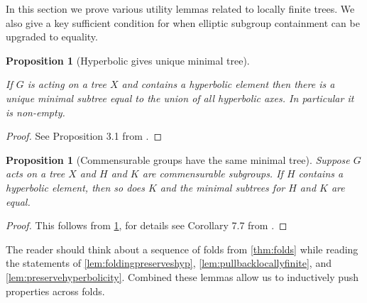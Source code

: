 \documentclass[12pt,parskip=full]{report}
\theoremstyle{plain}
\newtheorem{prop}[thm]{Proposition}
\theoremstyle{definition}
\begin{document}
In this section we prove various utility lemmas related to locally finite trees. We also give a key sufficient condition for when elliptic subgroup containment can be upgraded to equality.

\begin{prop}
    [Hyperbolic gives unique minimal tree]
    \label{pro:uniquemintree}
    
    If $G$ is acting on a tree $X$ and contains a hyperbolic element then there is a unique minimal subtree equal to the union of all hyperbolic axes. In particular it is non-empty.
\end{prop}
\begin{proof}
See Proposition 3.1 from \cite{hymanbass}.
\end{proof}
\begin{prop}
    [Commensurable groups have the same minimal tree]
    \label{pro:commintree}
    Suppose $G$ acts on a tree $X$ and $H$ and $K$ are commensurable subgroups. If $H$ contains a hyperbolic element, then so does $K$ and the minimal subtrees for $H$ and $K$ are equal.
\end{prop}
\begin{proof}
    This follows from \ref{pro:uniquemintree}, for details see Corollary 7.7 from \cite{hymanbass}.
\end{proof}

The reader should think about a sequence of folds from \ref{thm:folds} while reading the statements of \ref{lem:foldingpreserveshyp}, \ref{lem:pullbacklocallyfinite}, and \ref{lem:preservehyperbolicity}. Combined these lemmas allow us to inductively push properties across folds.
\end{document}
